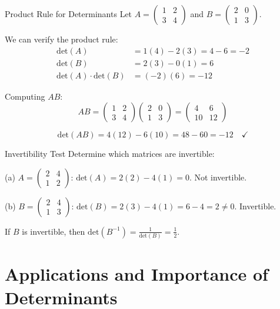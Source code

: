 \documentclass[12pt,a4paper]{article}
\newcommand{\Det}{\text{det}}
\begin{document}
	\begin{example}{Product Rule for Determinants}
		Let $A = \begin{pmatrix} 1 & 2 \\ 3 & 4 \end{pmatrix}$ and $B = \begin{pmatrix} 2 & 0 \\ 1 & 3 \end{pmatrix}$.
		
		We can verify the product rule:
		\begin{align*}
			\Det(A) &= 1(4) - 2(3) = 4 - 6 = -2 \\
			\Det(B) &= 2(3) - 0(1) = 6 \\
			\Det(A) \cdot \Det(B) &= (-2)(6) = -12
		\end{align*}
		
		Computing $AB$:
		\[
		AB = \begin{pmatrix} 1 & 2 \\ 3 & 4 \end{pmatrix} \begin{pmatrix} 2 & 0 \\ 1 & 3 \end{pmatrix} = \begin{pmatrix} 4 & 6 \\ 10 & 12 \end{pmatrix}
		\]
		
		\[
		\Det(AB) = 4(12) - 6(10) = 48 - 60 = -12 \quad \checkmark
		\]
	\end{example}
	
	\begin{example}{Invertibility Test}
		Determine which matrices are invertible:
		
		(a) $A = \begin{pmatrix} 2 & 4 \\ 1 & 2 \end{pmatrix}$: $\Det(A) = 2(2) - 4(1) = 0$. Not invertible.
		
		(b) $B = \begin{pmatrix} 2 & 4 \\ 1 & 3 \end{pmatrix}$: $\Det(B) = 2(3) - 4(1) = 6 - 4 = 2 \neq 0$. Invertible.
		
		If $B$ is invertible, then $\Det(B^{-1}) = \frac{1}{\Det(B)} = \frac{1}{2}$.
	\end{example}
	
	\section{Applications and Importance of Determinants}
	
\end{document}
